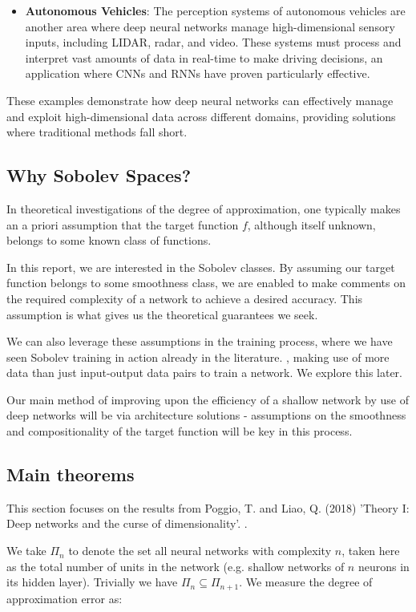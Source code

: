 \documentclass[11pt,a4paper]{article}
\theoremstyle{plain}
\theoremstyle{definition}
\theoremstyle{remark}
\begin{document}
\begin{itemize}
    \item \textbf{Autonomous Vehicles}: The perception systems of autonomous vehicles are another area where deep neural networks manage high-dimensional sensory inputs, including LIDAR, radar, and video. These systems must process and interpret vast amounts of data in real-time to make driving decisions, an application where CNNs and RNNs have proven particularly effective.

\end{itemize}

These examples demonstrate how deep neural networks can effectively manage and exploit high-dimensional data across different domains, providing solutions where traditional methods fall short.

\subsection{Why Sobolev Spaces?}

In theoretical investigations of the degree of approximation, one typically makes an a priori assumption that the target function \(f\), although itself unknown, belongs to some known class of functions.

In this report, we are interested in the Sobolev classes. By assuming our target function belongs to some smoothness class, we are enabled to make comments on the required complexity of a network to achieve a desired accuracy. This assumption is what gives us the theoretical guarantees we seek.

We can also leverage these assumptions in the training process, where we have seen Sobolev training in action already in the literature. \cite{sobolevtraining}, making use of more data than just input-output data pairs to train a network. We explore this later.

Our main method of improving upon the efficiency of a shallow network by use of deep networks will be via architecture solutions - assumptions on the smoothness and compositionality of the target function will be key in this process.

\subsection{Main theorems}

This section focuses on the results from Poggio, T. and Liao, Q. (2018) 'Theory I: Deep networks and the curse of dimensionality'. \cite{poggio}.

We take \(\Pi_{n}\) to denote the set all neural networks with complexity \(n\), taken here as the total number of units in the network (e.g. shallow networks of \(n\) neurons in its hidden layer). Trivially we have \(\Pi_{n} \subseteq \Pi_{n+1} \).
We measure the degree of approximation error as:
\end{document}
